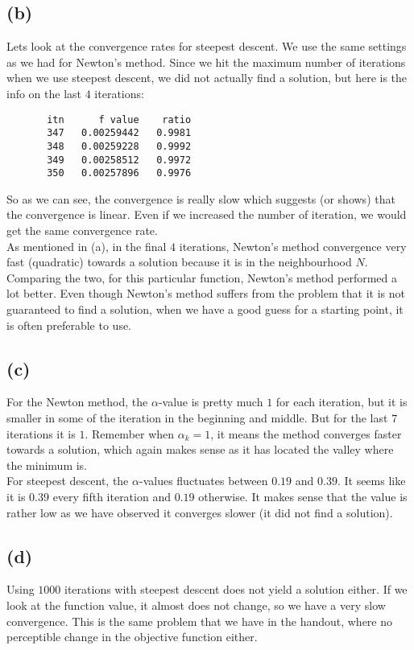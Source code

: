\documentclass[a4paper, fleqn]{article}
\begin{document}
\subsection{(b)}
Lets look at the convergence rates for steepest descent. We use the same settings as we had for Newton's method. Since we hit the maximum number of iterations when we use steepest descent, we did not actually find a solution, but here is the info on the last $4$ iterations:
\begin{verbatim}
       itn      f value    ratio
       347   0.00259442   0.9981
       348   0.00259228   0.9992
       349   0.00258512   0.9972
       350   0.00257896   0.9976
\end{verbatim}
So as we can see, the convergence is really slow which suggests (or shows) that the convergence is linear. Even if we increased the number of iteration, we would get the same convergence rate. \\
As mentioned in (a), in the final $4$ iterations, Newton's method convergence very fast (quadratic) towards a solution because it is in the neighbourhood $N$. \\
Comparing the two, for this particular function, Newton's method performed a lot better. Even though Newton's method suffers from the problem that it is not guaranteed to find a solution, when we have a good guess for a starting point, it is often preferable to use.

\subsection{(c)}
For the Newton method, the $\alpha$-value is pretty much $1$ for each iteration, but it is smaller in some of the iteration in the beginning and middle. But for the last $7$ iterations it is $1$. Remember when $\alpha_k=1$, it means the method converges faster towards a solution, which again makes sense as it has located the valley where the minimum is. \\
For steepest descent, the $\alpha$-values fluctuates between $0.19$ and $0.39$. It seems like it is $0.39$ every fifth iteration and $0.19$ otherwise. It makes sense that the value is rather low as we have observed it converges slower (it did not find a solution).

\subsection{(d)}
Using $1000$ iterations with steepest descent does not yield a solution either. If we look at the function value, it almost does not change, so we have a very slow convergence. This is the same problem that we have in the handout, where no perceptible change in the objective function either.
\end{document}
